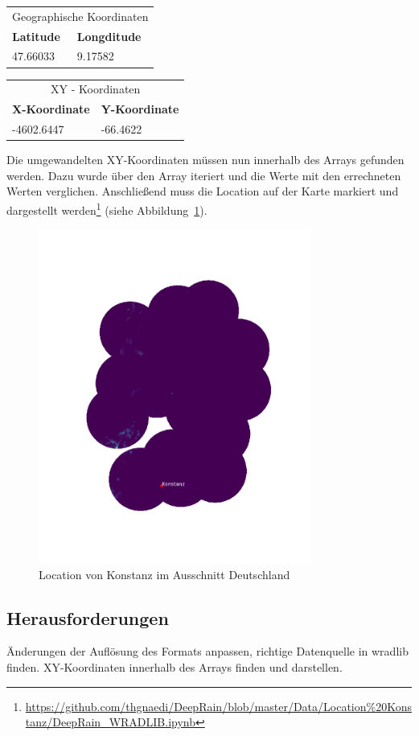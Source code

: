 \begin{table}[H]
\centering
\begin{tabularx}{8cm}{X|X}
\multicolumn{2}{c}{Geographische Koordinaten}\\
\textbf{Latitude} & \textbf{Longditude}\\\hline
47.66033          & 9.17582\\
\end{tabularx} 	
\end{table}

\begin{table}[H]
\centering
\begin{tabularx}{8cm}{X|X}
\multicolumn{2}{c}{XY - Koordinaten}\\
\textbf{X-Koordinate} & \textbf{Y-Koordinate}\\\hline
-4602.6447            & -66.4622\\
\end{tabularx} 	
\end{table}

Die umgewandelten XY-Koordinaten müssen nun innerhalb des Arrays gefunden werden. Dazu wurde über den Array iteriert und die Werte mit den errechneten Werten verglichen. Anschließend muss die Location auf der Karte markiert und dargestellt werden\footnote{\url{https://github.com/thgnaedi/DeepRain/blob/master/Data/Location\%20Konstanz/DeepRain_WRADLIB.ipynb}} (siehe Abbildung~\ref{fig:location}).

\begin{figure}[H]
	\centering
	\includegraphics[width=0.8\textwidth]{pics/Location.png}
	\caption{Location von Konstanz im Ausschnitt Deutschland}
	\label{fig:location}
\end{figure}

\subsection{Herausforderungen} 
Änderungen der Auflösung des Formats anpassen, richtige Datenquelle in wradlib finden. XY-Koordinaten innerhalb des Arrays finden und darstellen.
